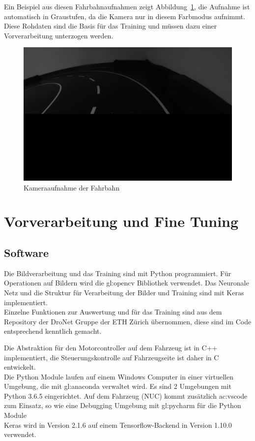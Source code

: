 Ein Beispiel aus diesen Fahrbahnaufnahmen zeigt Abbildung~\ref{img:rohbild}, die Aufnahme ist automatisch in Graustufen, da die Kamera nur in diesem Farbmodus aufnimmt.
Diese Rohdaten sind die Basis für das Training und müssen dazu einer Vorverarbeitung unterzogen werden. 

\begin{figure}[h]
	\centering
	\includegraphics[scale=0.4]{figures/Rohbild.png}
	\caption{Kameraaufnahme der Fahrbahn}
	\label{img:rohbild}
\end{figure}


\section{Vorverarbeitung und Fine Tuning}

\subsection{Software}
Die Bildverarbeitung und das Training sind mit Python programmiert. Für Operationen auf Bildern wird die \gls{gl:opencv} Bibliothek verwendet. Das Neuronale Netz und die Struktur für Verarbeitung der Bilder und Training sind mit Keras implementiert.\\
Einzelne Funktionen zur Auswertung und für das Training sind aus dem Repository der DroNet Gruppe der ETH Zürich übernommen, diese sind im Code entsprechend kenntlich gemacht.

Die Abstraktion für den Motorcontroller auf dem Fahrzeug ist in C++ implementiert, die Steuerungskontrolle auf Fahrzeugseite ist daher in C entwickelt.\\
Die Python Module laufen auf einem Windows Computer in einer virtuellen Umgebung, die mit \gls{gl:anaconda} verwaltet wird. Es sind 2 Umgebungen mit Python 3.6.5 eingerichtet. Auf dem Fahrzeug (NUC) kommt zusätzlich \gls{ac:vscode} zum Einsatz, so wie eine Debugging Umgebung mit \gls{gl:pycharm} für die Python Module\\
Keras wird in Version 2.1.6 auf einem Tensorflow-Backend in Version 1.10.0 verwendet.

